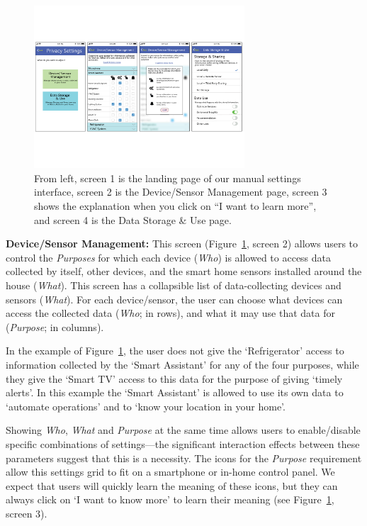 \begin{figure}
	\centering
	\includegraphics[width=0.7\textwidth]{figures/interface.pdf}
	\caption{From left, screen 1 is the landing page of our manual settings interface, screen 2 is the Device/Sensor Management page, screen 3 shows the explanation when you click on ``I want to learn more'', and screen 4 is the Data Storage \& Use page.}
	\label{fig:interface2}
\end{figure}

\textbf{Device/Sensor Management:} This screen (Figure~\ref{fig:interface2}, screen 2) allows users to control the \emph{Purposes} for which each device (\emph{Who}) is allowed to access data collected by itself, other devices, and the smart home sensors installed around the house (\emph{What}). This screen has a collapsible list of data-collecting devices and sensors (\emph{What}). For each device/sensor, the user can choose what devices can access the collected data (\emph{Who}; in rows), and what it may use that data for (\emph{Purpose}; in columns).

In the example of Figure~\ref{fig:interface2}, the user does not give the `Refrigerator' access to information collected by the `Smart Assistant' for any of the four purposes, while they give the `Smart TV' access to this data for the purpose of giving `timely alerts'. In this example the `Smart Assistant' is allowed to use its own data to `automate operations' and to `know your location in your home'.

Showing \emph{Who}, \emph{What} and \emph{Purpose} at the same time allows users to enable/disable specific combinations of settings---the significant interaction effects between these parameters suggest that this is a necessity. The icons for the \emph{Purpose} requirement allow this settings grid to fit on a smartphone or in-home control panel. We expect that users will quickly learn the meaning of these icons, but they can always click on `I want to know more' to learn their meaning (see Figure~\ref{fig:interface2}, screen 3). 

